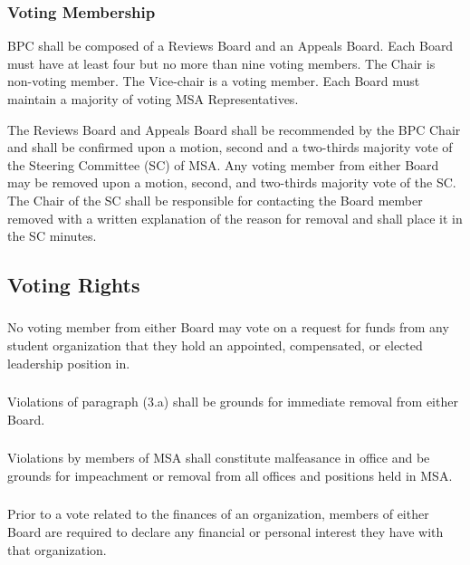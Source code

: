 \subsubsection{Voting Membership}
\subsubsubsection{}
BPC shall be composed of a Reviews Board and an Appeals Board.
\subsubsubsubsection{}
Each Board must have at least four but no more than nine voting members.
\subsubsubsubsubsection{}
The Chair is non-voting member.
\subsubsubsubsubsection{}
The Vice-chair is a voting member.
\subsubsubsubsection{}
Each Board must maintain a majority of voting MSA Representatives.

\subsubsubsection{}
The Reviews Board and Appeals Board shall be recommended by the BPC Chair and shall be confirmed upon a motion, second and a two-thirds majority vote of the Steering Committee (SC) of MSA.
\subsubsubsubsection{}
Any voting member from either Board may be removed upon a motion, second, and two-thirds majority vote of the SC.
\subsubsubsubsection{}
The Chair of the SC shall be responsible for contacting the Board member removed with a written explanation of the reason for removal and shall place it in the SC minutes. 

\subsection{Voting Rights}
\subsubsection{}
No voting member from either Board may vote on a request for funds from any student organization that they hold an appointed, compensated, or elected leadership position in.

\subsubsection{}
Violations of paragraph (3.a) shall be grounds for immediate removal from either Board.

\subsubsection{}
Violations by members of MSA shall constitute malfeasance in office and be grounds for impeachment or removal from all offices and positions held in MSA.

\subsubsection{}
Prior to a vote related to the finances of an organization, members of either Board are required to declare any financial or personal interest they have with that organization.

